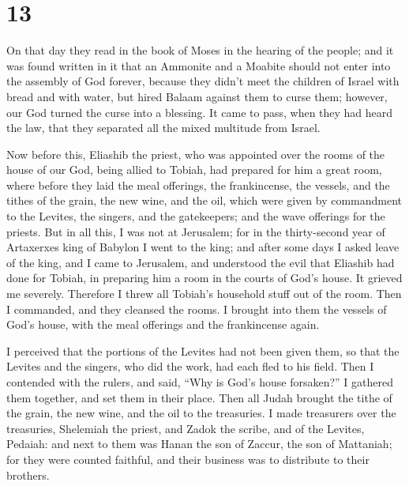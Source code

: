 \hypertarget{section-12}{%
\section{13}\label{section-12}}

 On that day they read in the book of Moses in the hearing
of the people; and it was found written in it that an Ammonite and a
Moabite should not enter into the assembly of God forever, 
because they didn't meet the children of Israel with bread and with
water, but hired Balaam against them to curse them; however, our God
turned the curse into a blessing.  It came to pass, when
they had heard the law, that they separated all the mixed multitude from
Israel.

 Now before this, Eliashib the priest, who was appointed
over the rooms of the house of our God, being allied to Tobiah,
 had prepared for him a great room, where before they laid
the meal offerings, the frankincense, the vessels, and the tithes of the
grain, the new wine, and the oil, which were given by commandment to the
Levites, the singers, and the gatekeepers; and the wave offerings for
the priests.  But in all this, I was not at Jerusalem; for
in the thirty-second year of Artaxerxes king of Babylon I went to the
king; and after some days I asked leave of the king,  and I
came to Jerusalem, and understood the evil that Eliashib had done for
Tobiah, in preparing him a room in the courts of God's house.
 It grieved me severely. Therefore I threw all Tobiah's
household stuff out of the room.  Then I commanded, and they
cleansed the rooms. I brought into them the vessels of God's house, with
the meal offerings and the frankincense again.

 I perceived that the portions of the Levites had not been
given them, so that the Levites and the singers, who did the work, had
each fled to his field.  Then I contended with the rulers,
and said, ``Why is God's house forsaken?'' I gathered them together, and
set them in their place.  Then all Judah brought the tithe
of the grain, the new wine, and the oil to the treasuries. 
I made treasurers over the treasuries, Shelemiah the priest, and Zadok
the scribe, and of the Levites, Pedaiah: and next to them was Hanan the
son of Zaccur, the son of Mattaniah; for they were counted faithful, and
their business was to distribute to their brothers.

